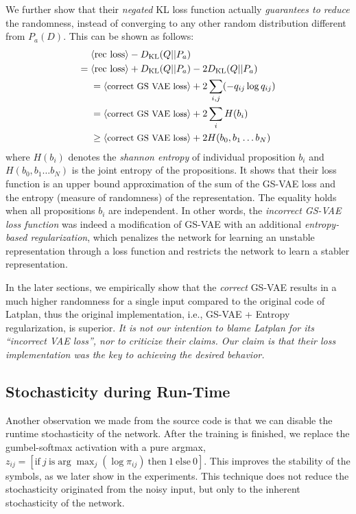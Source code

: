 We further show that their \emph{negated} KL loss function
actually \emph{guarantees to reduce} the randomness,
instead of converging to any other random distribution different from $P_a(D)$.
This can be shown as follows:
\begin{align*} 
 \brackets{\text{rec loss}}-D_{\text{KL}}(Q||P_a) &                                   \\
=\brackets{\text{rec loss}}+D_{\text{KL}}(Q||P_a) &- 2 D_{\text{KL}}(Q||P_a)          \\
=\brackets{\text{\small correct GS VAE loss}}     & + 2 \sum_{i,j} (- q_{ij} \log q_{ij}) \\
=\brackets{\text{\small correct GS VAE loss}}     & + 2 \sum_{i} H(b_i)                   \\
\geq\brackets{\text{\small correct GS VAE loss}}  & + 2 H(b_0,b_1\ldots b_N)
\end{align*}
where $H(b_i)$ denotes the \emph{shannon entropy} of individual proposition $b_i$ and
$H(b_0,b_1\ldots b_N)$ is the joint entropy of the propositions.
It shows that their loss function is an upper bound approximation of
the sum of the GS-VAE loss and the entropy (measure of randomness) of the representation.
The equality holds when all propositions $b_i$ are independent.
% 
In other words,
the \emph{incorrect GS-VAE loss function}
was indeed a modification of GS-VAE with an additional \emph{entropy-based regularization},
which penalizes the network for learning an unstable representation
through a loss function and restricts the network to learn a stabler representation.

In the later sections, we empirically show that the \emph{correct} GS-VAE results in
a much higher randomness for a single input compared to the original code of Latplan,
thus the original implementation, i.e., GS-VAE + Entropy regularization, is superior.
% 
\emph{It is not our intention to blame Latplan for its ``incorrect VAE loss'',
nor to criticize their claims.
Our claim is that their loss implementation was the key to achieving the desired behavior.}

\subsection{Stochasticity during Run-Time}

Another observation we made from the source code is that we can
disable the runtime stochasticity of the network.
After the training is finished, we replace the gumbel-softmax activation with
a pure argmax,
$z_{ij} = [ \text{if}\ j\ \text{is} \arg \max_j (\log \pi_{ij})\ \text{then}\ 1\ \text{else}\ 0 ]$.
This improves the stability of the symbols, as we later show in the experiments.
% 
This technique does not reduce the stochasticity originated from the noisy input,
but only to the inherent stochasticity of the network.

